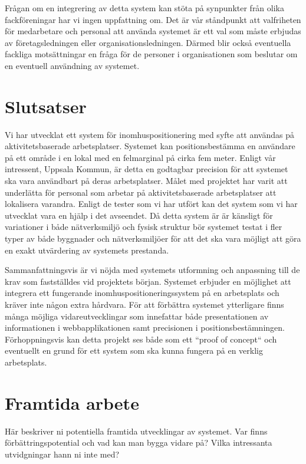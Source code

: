 \documentclass[a4paper,12pt]{article}
\begin{document}
Frågan om en integrering av detta system kan stöta på synpunkter från olika \\fackföreningar har vi ingen uppfattning om. Det är vår ståndpunkt att valfriheten för medarbetare och personal att använda systemet är ett val som måste erbjudas av företagsledningen eller organisationsledningen. Därmed blir också eventuella fackliga motsättningar en fråga för de personer i organisationen som beslutar om en eventuell användning av systemet.



\section{Slutsatser}

Vi har utvecklat ett system för inomhuspositionering med syfte att användas på aktivitetsbaserade arbetsplatser. Systemet kan positionsbestämma en användare på ett område i en lokal med en felmarginal på cirka fem meter. Enligt vår intressent, Uppsala Kommun, är detta en godtagbar precision för att systemet ska vara användbart på deras arbetsplatser. Målet med projektet har varit att underlätta för personal som arbetar på aktivitetsbaserade arbetsplatser att lokalisera varandra. Enligt de tester som vi har utfört kan det system som vi har utvecklat vara en hjälp i det avseendet.
Då detta system är är känsligt för variationer i både nätverksmiljö och fysisk struktur bör systemet testat i fler typer av både byggnader och nätverksmiljöer för att det ska vara möjligt att göra en exakt utvärdering av systemets prestanda.

Sammanfattningsvis är vi nöjda med systemets utformning och anpassning till de krav som fastställdes vid projektets början. Systemet erbjuder en möjlighet att integrera ett fungerande inomhuspositioneringssystem på en arbetsplats och kräver inte någon extra hårdvara. För att förbättra systemet ytterligare finns många möjliga vidareutvecklingar som innefattar både presentationen av informationen i webbapplikationen samt precisionen i positionsbestämningen. Förhoppningsvis kan detta projekt ses både som ett ``proof of concept`` och eventuellt en grund för ett system som ska kunna fungera på en verklig arbetsplats.

\section{Framtida arbete}
\iffalse
Här beskriver ni potentiella framtida utvecklingar av systemet. Var finns förbättrings\-poten\-tial och vad kan man bygga vidare på? Vilka intressanta utvidgningar hann ni inte med?
\end{document}
